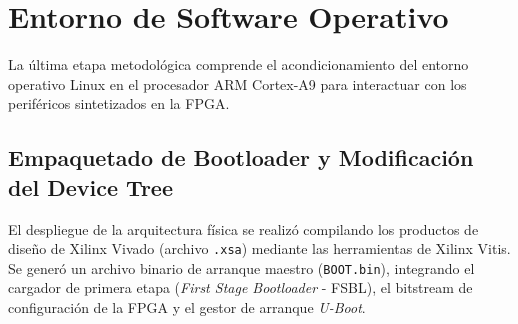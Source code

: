 \section{Entorno de Software Operativo}
\label{sec:software_operativo}

La última etapa metodológica comprende el acondicionamiento del entorno operativo Linux en el procesador ARM Cortex-A9 para interactuar con los periféricos sintetizados en la FPGA.

\subsection{Empaquetado de Bootloader y Modificación del Device Tree}
\label{ssec:bootloader_dts}

El despliegue de la arquitectura física se realizó compilando los productos de diseño de Xilinx Vivado (archivo \texttt{.xsa}) mediante las herramientas de Xilinx Vitis. Se generó un archivo binario de arranque maestro (\texttt{BOOT.bin}), integrando el cargador de primera etapa (\textit{First Stage Bootloader} - FSBL), el bitstream de configuración de la FPGA y el gestor de arranque \textit{U-Boot}.




